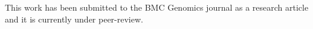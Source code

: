 This work has been submitted to the BMC Genomics journal as a research article and it is currently under peer-review.
